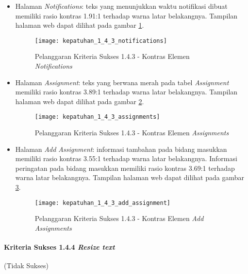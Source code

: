 \begin{itemize}
	\item Halaman \textit{Notifications}: teks yang menunjukkan waktu notifikasi dibuat memiliki rasio kontras 1.91:1 terhadap warna latar belakangnya. Tampilan halaman web dapat dilihat pada gambar \ref{fig:kepatuhan_1_4_3_notifications}.
	\begin{figure}[H]
		\centering  
		\texttt{[image: kepatuhan\_1\_4\_3\_notifications]}  
		\caption[Pelanggaran Kriteria Sukses 1.4.3 - Kontras Elemen \textit{Notifications}]{Pelanggaran Kriteria Sukses 1.4.3 - Kontras Elemen \textit{Notifications}} 
		\label{fig:kepatuhan_1_4_3_notifications} 
	\end{figure}
	
	\item Halaman \textit{Assignment}: teks yang berwana merah pada tabel \textit{Assignment} memiliki rasio kontras 3.89:1 terhadap warna latar belakangnya. Tampilan halaman web dapat dilihat pada gambar \ref{fig:kepatuhan_1_4_3_assignments}.
	\begin{figure}[H]
		\centering  
		\texttt{[image: kepatuhan\_1\_4\_3\_assignments]}  
		\caption[Pelanggaran Kriteria Sukses 1.4.3 - Kontras Elemen \textit{Assignments}]{Pelanggaran Kriteria Sukses 1.4.3 - Kontras Elemen \textit{Assignments}} 
		\label{fig:kepatuhan_1_4_3_assignments} 
	\end{figure}
	
	\item Halaman \textit{Add Assignment}: informasi tambahan pada bidang masukkan memiliki rasio kontras 3.55:1 terhadap warna latar belakangnya. Informasi peringatan pada bidang masukkan memiliki rasio kontras 3.69:1 terhadap warna latar belakangnya. Tampilan halaman web dapat dilihat pada gambar \ref{fig:kepatuhan_1_4_3_add_assignment}.
	\begin{figure}[H]
		\centering  
		\texttt{[image: kepatuhan\_1\_4\_3\_add\_assignment]}  
		\caption[Pelanggaran Kriteria Sukses 1.4.3 - Kontras Elemen \textit{Add Assignments}]{Pelanggaran Kriteria Sukses 1.4.3 - Kontras Elemen \textit{Add Assignments}} 
		\label{fig:kepatuhan_1_4_3_add_assignment} 
	\end{figure}
	
\end{itemize}

\paragraph{Kriteria Sukses 1.4.4 \textit{Resize text}}
\label{subsubsec:kepatuhan_kriteria_1.4.4}
(Tidak Sukses) \\

